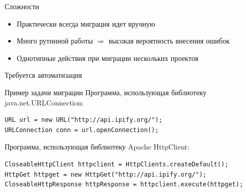\documentclass[12pt]{beamer}
\begin{document}
{
\begin{frame}{Сложности}
\begin{mybox}[]
\begin{itemize}
	\item Практически всегда миграция идет вручную
	\item Много рутинной работы $\Longrightarrow$ высокая вероятность внесения ошибок
	\item Однотипные действия при миграции нескольких проектов
\end{itemize}
\end{mybox}
\vspace{0.5cm}
\begin{mybox}[]
\begin{center}
    Требуется автоматизация
\end{center}
\end{mybox}
\end{frame}
}

\begin{frame}[fragile]{Пример задачи миграции}
	Программа, использующая библиотеку java.net.URLConnection:
\begin{verbatim}
URL url = new URL("http://api.ipify.org/");
URLConnection conn = url.openConnection();
\end{verbatim}
	Программа, использующая библиотеку Apache HttpClient:
\begin{verbatim}
CloseableHttpClient httpclient = HttpClients.createDefault();
HttpGet httpget = new HttpGet("http://api.ipify.org/");
CloseableHttpResponse httpResponse = httpclient.execute(httpget);
\end{verbatim}
\end{frame}
\end{document}

